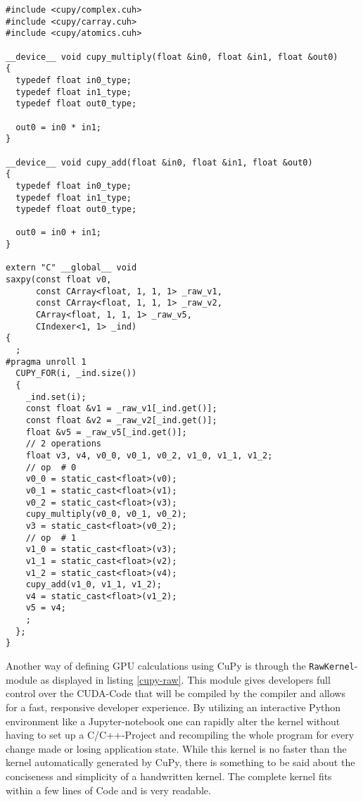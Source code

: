 \documentclass[english,11pt,a4paper,table]{article} %
\begin{document}
\begin{verbatim}
#include <cupy/complex.cuh>
#include <cupy/carray.cuh>
#include <cupy/atomics.cuh>

__device__ void cupy_multiply(float &in0, float &in1, float &out0)
{
  typedef float in0_type;
  typedef float in1_type;
  typedef float out0_type;

  out0 = in0 * in1;
}

__device__ void cupy_add(float &in0, float &in1, float &out0)
{
  typedef float in0_type;
  typedef float in1_type;
  typedef float out0_type;

  out0 = in0 + in1;
}

extern "C" __global__ void
saxpy(const float v0,
      const CArray<float, 1, 1, 1> _raw_v1,
      const CArray<float, 1, 1, 1> _raw_v2,
      CArray<float, 1, 1, 1> _raw_v5,
      CIndexer<1, 1> _ind)
{
  ;
#pragma unroll 1
  CUPY_FOR(i, _ind.size())
  {
    _ind.set(i);
    const float &v1 = _raw_v1[_ind.get()];
    const float &v2 = _raw_v2[_ind.get()];
    float &v5 = _raw_v5[_ind.get()];
    // 2 operations
    float v3, v4, v0_0, v0_1, v0_2, v1_0, v1_1, v1_2;
    // op  # 0
    v0_0 = static_cast<float>(v0);
    v0_1 = static_cast<float>(v1);
    v0_2 = static_cast<float>(v3);
    cupy_multiply(v0_0, v0_1, v0_2);
    v3 = static_cast<float>(v0_2);
    // op  # 1
    v1_0 = static_cast<float>(v3);
    v1_1 = static_cast<float>(v2);
    v1_2 = static_cast<float>(v4);
    cupy_add(v1_0, v1_1, v1_2);
    v4 = static_cast<float>(v1_2);
    v5 = v4;
    ;
  };
}
\end{verbatim}

Another way of defining GPU calculations using CuPy is through the \texttt{RawKernel}-module as displayed in listing \ref{cupy-raw}.
This module gives developers full control over the CUDA-Code that will be compiled by the compiler and allows for a fast, responsive developer experience.
By utilizing an interactive Python environment like a Jupyter-notebook one can rapidly alter the kernel without having to set up a C/C++-Project and recompiling the whole program for every change made or losing application state.
While this kernel is no faster than the kernel automatically generated by CuPy, there is something to be said about the conciseness and simplicity of a handwritten kernel.
The complete kernel fits within a few lines of Code and is very readable.
\end{document}
